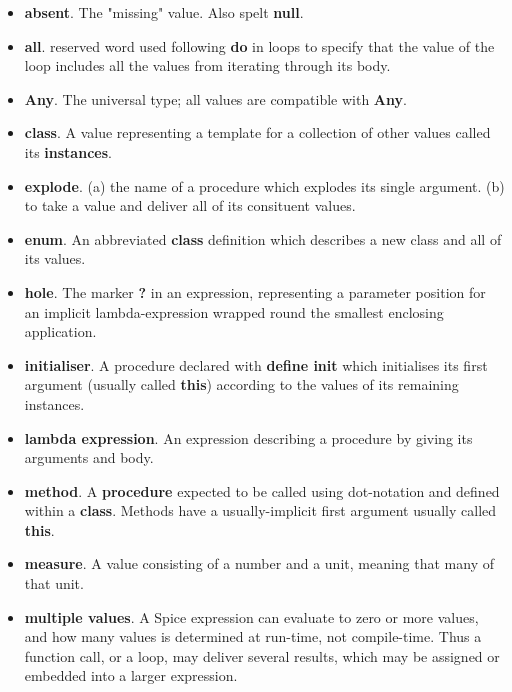 \documentclass{report}
\begin{document}
\begin{itemize}\item {\bf absent}. The "missing" value. Also spelt {\bf null}.

\item {\bf all}. reserved word used following {\bf do} in loops to specify that the value of
the loop includes all the values from iterating through its body.

\item {\bf Any}. The universal type; all values are compatible with {\bf Any}.

\item {\bf class}. A value representing a template for a collection of other values
called its {\bf instances}.

\item {\bf explode}. (a) the name of a procedure which explodes its single argument. (b)
to take a value and deliver all of its consituent values.

\item {\bf enum}. An abbreviated {\bf class} definition which describes a new class and all
of its values.

\item {\bf hole}. The marker {\bf ?} in an expression, representing a parameter position
for an implicit lambda-expression wrapped round the smallest enclosing
application.

\item {\bf initialiser}. A procedure declared with {\bf define init} which initialises
its first argument (usually called {\bf this}) according to the values of its
remaining instances.

\item {\bf lambda expression}. An expression describing a procedure by giving its
arguments and body.

\item {\bf method}. A {\bf procedure} expected to be called using dot-notation and defined
within a {\bf class}. Methods have a usually-implicit first argument usually
called {\bf this}.

\item {\bf measure}. A value consisting of a number and a unit, meaning that many of
that unit.

\item {\bf multiple values}. A Spice expression can evaluate to zero or more values,
and how many values is determined at run-time, not compile-time. Thus a
function call, or a loop, may deliver several results, which may be assigned
or embedded into a larger expression.


\end{itemize}
\end{document}
